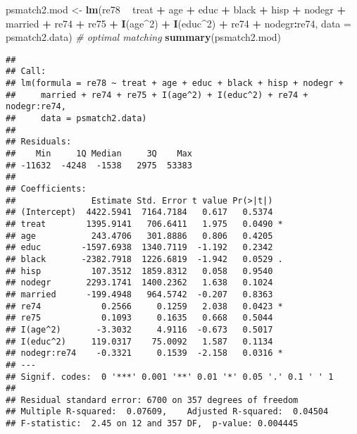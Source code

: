 \documentclass[]{article}
\newenvironment{Shaded}{\begin{snugshade}}{\end{snugshade}}
\newcommand{\CommentTok}[1]{\textcolor[rgb]{0.56,0.35,0.01}{\textit{#1}}}
\newcommand{\DataTypeTok}[1]{\textcolor[rgb]{0.13,0.29,0.53}{#1}}
\newcommand{\DecValTok}[1]{\textcolor[rgb]{0.00,0.00,0.81}{#1}}
\newcommand{\KeywordTok}[1]{\textcolor[rgb]{0.13,0.29,0.53}{\textbf{#1}}}
\newcommand{\NormalTok}[1]{#1}
\newcommand{\OperatorTok}[1]{\textcolor[rgb]{0.81,0.36,0.00}{\textbf{#1}}}
\newcommand{\StringTok}[1]{\textcolor[rgb]{0.31,0.60,0.02}{#1}}
\begin{document}
\begin{Shaded}
\begin{Highlighting}[]
\NormalTok{psmatch2.mod <-}\StringTok{ }\KeywordTok{lm}\NormalTok{(re78 }\OperatorTok{~}\StringTok{ }\NormalTok{treat }\OperatorTok{+}\StringTok{ }\NormalTok{age }\OperatorTok{+}\StringTok{ }\NormalTok{educ }\OperatorTok{+}\StringTok{ }\NormalTok{black }\OperatorTok{+}\StringTok{ }\NormalTok{hisp }\OperatorTok{+}\StringTok{ }\NormalTok{nodegr }\OperatorTok{+}\StringTok{ }\NormalTok{married }\OperatorTok{+}\StringTok{ }\NormalTok{re74 }\OperatorTok{+}\StringTok{ }\NormalTok{re75 }\OperatorTok{+}\StringTok{ }
\StringTok{                     }\KeywordTok{I}\NormalTok{(age}\OperatorTok{^}\DecValTok{2}\NormalTok{) }\OperatorTok{+}\StringTok{ }\KeywordTok{I}\NormalTok{(educ}\OperatorTok{^}\DecValTok{2}\NormalTok{) }\OperatorTok{+}\StringTok{ }\NormalTok{re74 }\OperatorTok{+}\StringTok{ }\NormalTok{nodegr}\OperatorTok{:}\NormalTok{re74, }
                   \DataTypeTok{data =}\NormalTok{ psmatch2.data) }\CommentTok{# optimal matching}
\KeywordTok{summary}\NormalTok{(psmatch2.mod)}
\end{Highlighting}
\end{Shaded}

\begin{verbatim}
## 
## Call:
## lm(formula = re78 ~ treat + age + educ + black + hisp + nodegr + 
##     married + re74 + re75 + I(age^2) + I(educ^2) + re74 + nodegr:re74, 
##     data = psmatch2.data)
## 
## Residuals:
##    Min     1Q Median     3Q    Max 
## -11632  -4248  -1538   2975  53383 
## 
## Coefficients:
##               Estimate Std. Error t value Pr(>|t|)  
## (Intercept)  4422.5941  7164.7184   0.617   0.5374  
## treat        1395.9141   706.6411   1.975   0.0490 *
## age           243.4706   301.8886   0.806   0.4205  
## educ        -1597.6938  1340.7119  -1.192   0.2342  
## black       -2382.7918  1226.6819  -1.942   0.0529 .
## hisp          107.3512  1859.8312   0.058   0.9540  
## nodegr       2293.1741  1400.2362   1.638   0.1024  
## married      -199.4948   964.5742  -0.207   0.8363  
## re74            0.2566     0.1259   2.038   0.0423 *
## re75            0.1093     0.1635   0.668   0.5044  
## I(age^2)       -3.3032     4.9116  -0.673   0.5017  
## I(educ^2)     119.0317    75.0092   1.587   0.1134  
## nodegr:re74    -0.3321     0.1539  -2.158   0.0316 *
## ---
## Signif. codes:  0 '***' 0.001 '**' 0.01 '*' 0.05 '.' 0.1 ' ' 1
## 
## Residual standard error: 6700 on 357 degrees of freedom
## Multiple R-squared:  0.07609,    Adjusted R-squared:  0.04504 
## F-statistic:  2.45 on 12 and 357 DF,  p-value: 0.004445
\end{verbatim}
\end{document}
